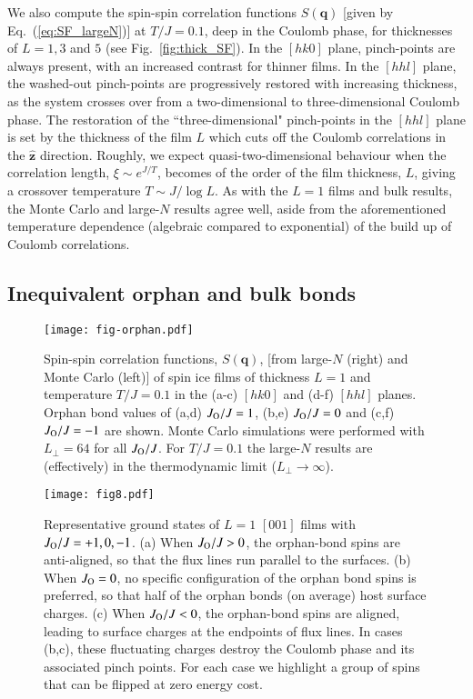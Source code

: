 \documentclass[aps,prx,reprint,runinaddress,superscriptaddress,amsmath,amssymb,floatfix,longbibliography]{revtex4-1}
\renewcommand{\vec}[1]{\boldsymbol{#1}}
\newcommand{\Jo}{J_{\rm O}}
\begin{document}
We also compute the spin-spin correlation functions $S(\vec{q})$ [given by Eq.~(\ref{eq:SF_largeN})] at $T/J = 0.1$, deep in the Coulomb phase, for thicknesses of $L=1,3$ and $5$ (see Fig.~\ref{fig:thick_SF}). In the $[hk0]$ plane, pinch-points are always present, with an increased contrast for thinner films. In the $[hhl]$ plane, the washed-out pinch-points are progressively restored with increasing thickness, as the system crosses over from a two-dimensional to three-dimensional Coulomb phase. The restoration of the ``three-dimensional" pinch-points in the $[hhl]$ plane is set by the thickness of the film $L$ which cuts off the Coulomb correlations in the $\vec{\hat{z}}$ direction. Roughly, we expect quasi-two-dimensional behaviour when the correlation length, $\xi \sim e^{J/T}$, becomes of the order of the film thickness, $L$, giving a crossover temperature $T \sim J/\log{L}$.  As with the $L=1$ films and bulk results, the Monte Carlo and large-$N$ results agree well, aside from the aforementioned temperature dependence (algebraic compared to exponential) of the build up of Coulomb correlations.

\subsection{Inequivalent orphan and bulk bonds}

\begin{figure*}[htp]
	\texttt{[image: fig-orphan.pdf]}
	\caption{Spin-spin correlation functions, $S(\vec{q})$, [from large-$N$ (right) and Monte Carlo (left)] of spin ice films of thickness $L=1$ and temperature $T/J = 0.1$ in the (a-c) $[hk0]$ and (d-f) $[hhl]$ planes.  Orphan bond values of (a,d) $\Jo/J = 1$, (b,e) $\Jo/J = 0$ and (c,f) $\Jo/J = -1$ are shown. Monte Carlo simulations were performed with $L_{\perp}=64$ for all $\Jo/J$. For $T/J=0.1$ the large-$N$ results are (effectively) in the thermodynamic limit ($L_\perp \rightarrow \infty$).
	\label{fig:orphan_SF}}
\end{figure*}

\begin{figure*}
  \centering
  	\texttt{[image: fig8.pdf]}
    \caption{Representative ground states of $L=1$ $[001]$ films with $\Jo/J = +1, 0, -1$. (a) When $\Jo/J > 0$, the orphan-bond spins are anti-aligned, so that the flux lines run parallel to the surfaces. (b) When $\Jo = 0$, no specific configuration of the orphan bond spins is preferred, so that half of the orphan bonds (on average) host surface charges. (c) When $\Jo / J < 0$, the orphan-bond spins are aligned, leading to surface charges at the endpoints of flux lines. In cases (b,c), these fluctuating charges destroy the Coulomb phase and its associated pinch points. For each case we highlight a group of spins that can be flipped at zero energy cost.
    }
	\label{fig:surfaces_orphan}
\end{figure*}
\end{document}
